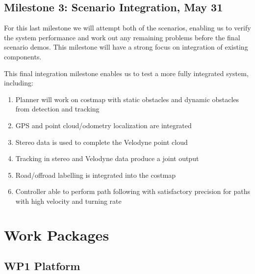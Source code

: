 \documentclass[11pt,a4paper]{article}
\begin{document}
\subsection{Milestone 3: Scenario Integration, May 31}
\label{milestone3}

For this last milestone we will attempt both of the scenarios, enabling
us to verify the system performance and work out any remaining problems
before the final scenario demos. This milestone will have a strong
focus on integration of existing components.

This final integration milestone enables us to test a more fully integrated system, including:
\begin{enumerate}
\item Planner will work on costmap with static obstacles and dynamic obstacles from detection and tracking
\item GPS and point cloud/odometry localization are integrated
\item Stereo data is used to complete the Velodyne point cloud
\item Tracking in stereo and Velodyne data produce a joint output
\item Road/offroad labelling is integrated into the costmap
\item Controller able to perform path following with satisfactory precision for paths with high velocity and turning rate
\end{enumerate}

\section{Work Packages}

\subsection{WP1 Platform} %
\end{document}
